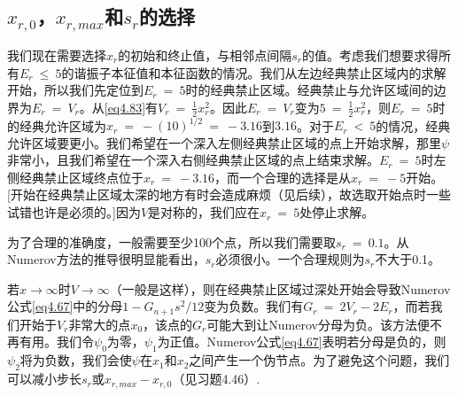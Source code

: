 \documentclass[12pt,a4paper,openany]{ctexbook}
\begin{document}
\subsection{$x_{r,0}$，$x_{r,max}$和$s_r$的选择}
\begin{flushleft}
    \setlength{\parindent}{2em}
我们现在需要选择$x_r$的初始和终止值，与相邻点间隔$s_r$的值。考虑我们想要求得所有$E_r\ \leq\ 5$的谐振子本征值和本征函数的情况。我们从左边经典禁止区域内的求解开始，所以我们先定位到$E_r\ =\ 5$时的经典禁止区域。经典禁止与允许区域间的边界为$E_r\ =\ V_r$。从\eqref{eq4.83}有$V_r\ =\ \frac{1}{2}x_r^2$。因此$E_r\ =\ V_r$变为$5\ =\ \frac{1}{2}x_r^2$，则$E_r\ =\ 5$时的经典允许区域为$x_r\ =\ -(10)^{1/2}\ =\ -3.16$到$3.16$。对于$E_r\ <\ 5$的情况，经典允许区域要更小。我们希望在一个深入左侧经典禁止区域的点上开始求解，那里$\psi$非常小，且我们希望在一个深入右侧经典禁止区域的点上结束求解。$E_r\ =\ 5$时左侧经典禁止区域终点位于$x_r\ =\ -3.16$，而一个合理的选择是从$x_r\ =\ -5$开始。[开始在经典禁止区域太深的地方有时会造成麻烦（见后续），故选取开始点时一些试错也许是必须的。]因为$V$是对称的，我们应在$x_r\ =\ 5$处停止求解。

为了合理的准确度，一般需要至少100个点，所以我们需要取$s_r\ =\ 0.1$。从Numerov方法的推导很明显能看出，$s_r$必须很小。一个合理规则为$s_r$不大于0.1。

\begin{center}
    \begin{minipage}{0.9\textwidth}
    \small
    若$x\to\infty$时$V\to\infty$（一般是这样），则在经典禁止区域过深处开始会导致Numerov公式\eqref{eq4.67}中的分母$1-G_{n+1}s^2/12$变为负数。我们有$G_r\ =\ 2V_r-2E_r$，而若我们开始于$V_r$非常大的点$x_0$，该点的$G_r$可能大到让Numerov分母为负。该方法便不再有用。我们令$\psi_0$为零，$\psi_1$为正值。Numerov公式\eqref{eq4.67}表明若分母是负的，则$\psi_2$将为负数，我们会使$\psi$在$x_1$和$x_2$之间产生一个伪节点。为了避免这个问题，我们可以减小步长$s_r$或$x_{r,max}-x_{r,0}$（见习题4.46）.
    \end{minipage}
\end{center}
\end{flushleft}
\end{document}
